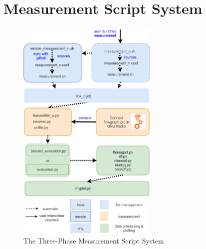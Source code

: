 \section{Measurement Script System}
\label{sec:script-system}

\begin{figure}[ht]
	\label{fig:script-system}
	\begin{center}
		\includegraphics[width=0.6\textwidth]{pictures/script_system}
	\end{center}
	\caption{The Three-Phase Measurement Script System}
\end{figure}